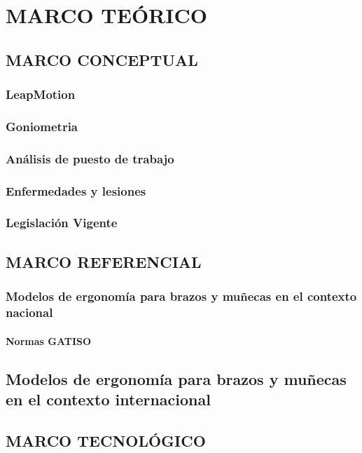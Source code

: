 \chapter{MARCO TEÓRICO}
\section{MARCO CONCEPTUAL}
\subsection{LeapMotion}
\subsection{Goniometria}
\subsection{Análisis de puesto de trabajo}
\subsection{Enfermedades y lesiones}
\subsection{Legislación Vigente}
\section{MARCO REFERENCIAL}
\subsection{Modelos de ergonomía para brazos y muñecas en el contexto nacional}
\subsubsection{Normas GATISO}
\section{Modelos de ergonomía para brazos y muñecas en el contexto internacional}
\section{MARCO TECNOLÓGICO}